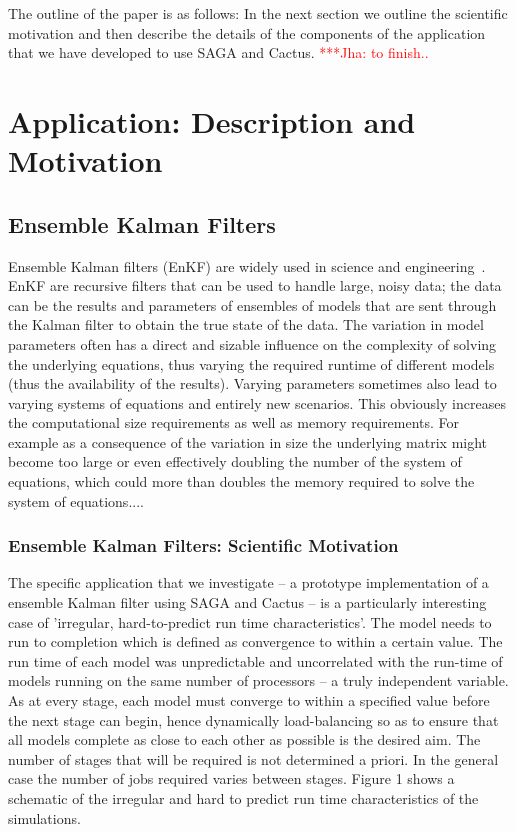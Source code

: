 \documentclass[conference,final]{IEEEtran}
\newcommand{\jhanote}[1]{ {\textcolor{red} { ***Jha: #1 }}}
\newcommand{\jhanote}[1]{}
\begin{document}
The outline of the paper is as follows: In the next section we outline
the scientific motivation and then describe the details of the
components of the application that we have developed to use SAGA and
Cactus.  \jhanote{to finish..}

\section{Application: Description and Motivation} 

\subsection{Ensemble Kalman Filters} 

Ensemble Kalman filters (EnKF) are widely used in science and
engineering~\cite{DataAssim, KalmanPaper}. EnKF are recursive filters
that can be used to handle large, noisy data; the data can be the
results and parameters of ensembles of models that are sent through
the Kalman filter to obtain the true state of the data. The variation
in model parameters often has a direct and sizable influence on the
complexity of solving the underlying equations, thus varying the
required runtime of different models (thus the availability of the
results).  Varying parameters sometimes also lead to varying systems
of equations and entirely new scenarios. This obviously increases the
computational size requirements as well as memory requirements.  For
example as a consequence of the variation in size the underlying
matrix might become too large or even effectively doubling the number
of the system of equations, which could more than doubles the memory
required to solve the system of equations....

\subsubsection{Ensemble Kalman Filters: Scientific Motivation}
The specific application that we investigate -- a prototype
implementation of a ensemble Kalman filter using SAGA and Cactus -- is
a particularly interesting case of 'irregular, hard-to-predict run
time characteristics'.  The model needs to run to completion which is
defined as convergence to within a certain value.  The run time of
each model was unpredictable and uncorrelated with the run-time of
models running on the same number of processors -- a truly independent
variable.  As at every stage, each model must converge to within a
specified value before the next stage can begin, hence dynamically
load-balancing so as to ensure that all models complete as close to
each other as possible is the desired aim.  The number of stages that
will be required is not determined a priori. In the general case the
number of jobs required varies between stages.  Figure 1 shows a
schematic of the irregular and hard to predict run time
characteristics of the simulations.
\end{document}
